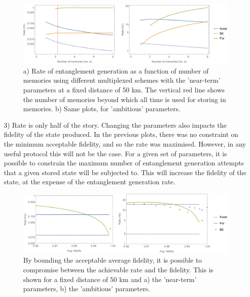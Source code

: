 \documentclass[aps,pra,superscriptaddress,preprint]{revtex4-1}
\begin{document}
\begin{figure}[htbp]
\begin{center}
\includegraphics[width=16.0cm]{AmbAndNearValuesRateVsMemories.pdf}
\caption{a) Rate of entanglement generation as a function of number of memories using different multiplexed schemes with the 'near-term' parameters at a fixed distance of 50 km. The vertical red line shows the number of memories beyond which all time is used for storing in memories. b) Same plots, for 'ambitious' parameters.}
\label{fig:AmbAndNearValuesRateVsMemories}
\end{center}
\end{figure}

3) Rate is only half of the story. Changing the parameters also impacts the fidelity of the state produced. In the previous plots, there was no constraint on the minimum acceptable fidelity, and so the rate was maximised. However, in any useful protocol this will not be the case. For a given set of parameters, it is possible to constrain the maximum number of entanglement generation attempts that a given stored state will be subjected to. This will increase the fidelity of the state, at the expense of the entanglement generation rate.

\begin{figure}[htbp]
\begin{center}
\includegraphics[width=16.0cm]{FidVsRateFixedDistance.pdf}
\caption{By bounding the acceptable average fidelity, it is possible to compromise between the achievable rate and the fidelity. This is shown for a fixed distance of 50 km and a) the 'near-term' parameters, b) the 'ambitious' parameters.}
\label{fig:FidVsRateFixedDistance}
\end{center}
\end{figure}
\end{document}
